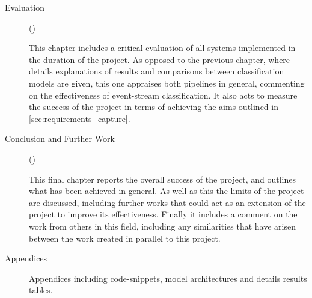 \begin{description}
      \item[Evaluation] ()
      
      This chapter includes a critical evaluation of all systems implemented in the duration of the project. As opposed to the previous chapter, where details explanations of results and comparisons between classification models are given, this one appraises both pipelines in general, commenting on the effectiveness of event-stream classification. It also acts to measure the success of the project in terms of achieving the aims outlined in \cref{sec:requirements_capture}.
      
      \item[Conclusion and Further Work] ()
      
      This final chapter reports the overall success of the project, and outlines what has been achieved in general. As well as this the limits of the project are discussed, including further works that could act as an extension of the project to improve its effectiveness. Finally it includes a comment on the work from others in this field, including any similarities that have arisen between the work created in parallel to this project.
      
      \item[Appendices]
      
      Appendices including code-snippets, model architectures and details results tables.
\end{description}